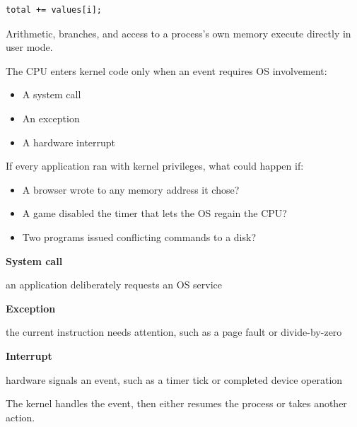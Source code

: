 \begin{slide}


	\begin{verbatim}
total += values[i];
	\end{verbatim}

	Arithmetic, branches, and access to a process's own memory execute directly in user mode.

	\bigskip

	The CPU enters kernel code only when an event requires OS involvement:

	\begin{itemize}
		\item A system call
		\item An exception
		\item A hardware interrupt
	\end{itemize}

\end{slide}

\begin{slide}


	If every application ran with kernel privileges, what could happen if:

	\bigskip

	\begin{itemize}
		\item A browser wrote to any memory address it chose?
		\item A game disabled the timer that lets the OS regain the CPU?
		\item Two programs issued conflicting commands to a disk?
	\end{itemize}

\end{slide}

\begin{slide}


	\textbf{System call}

	\leftspace an application deliberately requests an OS service

	\medskip

	\textbf{Exception}

	\leftspace the current instruction needs attention, such as a page fault or divide-by-zero

	\medskip

	\textbf{Interrupt}

	\leftspace hardware signals an event, such as a timer tick or completed device operation

	\bigskip

	The kernel handles the event, then either resumes the process or takes another action.

\end{slide}

